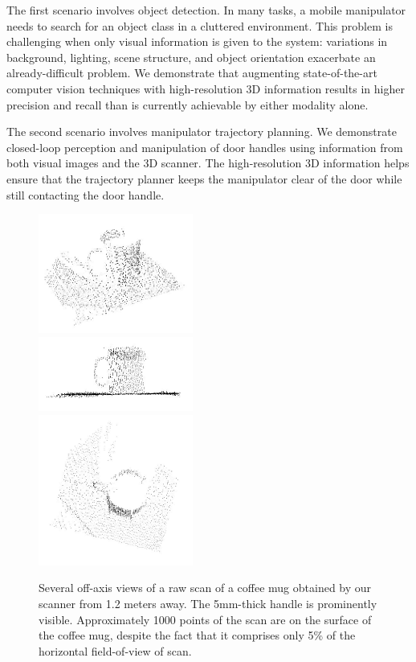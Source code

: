\documentclass[letterpaper, 10 pt, conference]{ieeeconf}  %
\begin{document}
The first scenario involves object detection. In many tasks, a mobile
manipulator needs to search for an object class in a cluttered environment.
This problem is challenging when only visual information is given to the
system: variations in background, lighting, scene structure, and object
orientation exacerbate an already-difficult problem. We demonstrate that
augmenting state-of-the-art computer vision techniques with high-resolution 3D
information results in higher precision and recall than is currently achievable
by either modality alone.

The second scenario involves manipulator trajectory planning. We demonstrate
closed-loop perception and manipulation of door handles using information from
both visual images and the 3D scanner. The high-resolution 3D information helps
ensure that the trajectory planner keeps the manipulator clear of the door
while still contacting the door handle.

\begin{figure}[t]
\begin{center}
  \includegraphics[width=2.0in]{mug_closeup_1.jpg} \\
  \includegraphics[width=2.0in]{mug_closeup_2.jpg} \\
  \includegraphics[width=2.0in]{mug_closeup_3.jpg}
\end{center}
\caption{Several off-axis views of a raw scan of a coffee mug obtained by our scanner from 1.2 meters away. The 5mm-thick handle is prominently visible. Approximately 1000 points of the scan are on the surface of the coffee mug, despite the fact that it comprises only 5\% of the horizontal field-of-view of scan.}
\label{fig:coffee_mug}
\end{figure}
\end{document}
